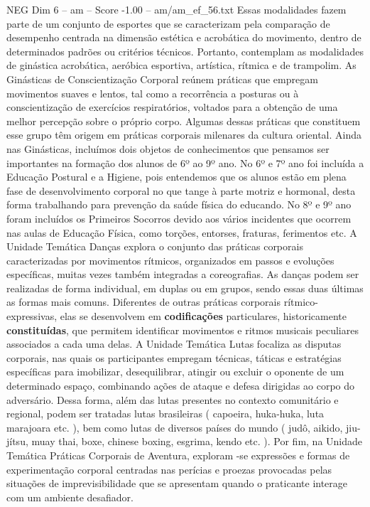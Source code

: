 \begin{textsample}{NEG Dim 6 – am – Score -1.00 – am/am\_ef\_56.txt}
Essas modalidades fazem parte de um conjunto de esportes que se caracterizam pela comparação de desempenho centrada na dimensão estética e acrobática do movimento, dentro de determinados padrões ou critérios técnicos.
Portanto, contemplam as modalidades de ginástica acrobática, aeróbica esportiva, artística, rítmica e de trampolim.
As Ginásticas de Conscientização Corporal reúnem práticas que empregam movimentos suaves e lentos, tal como a recorrência a posturas ou à conscientização de exercícios respiratórios, voltados para a obtenção de uma melhor percepção sobre o próprio corpo.
Algumas dessas práticas que constituem esse grupo têm origem em práticas corporais milenares da cultura oriental.
Ainda nas Ginásticas, incluímos dois objetos de conhecimentos que pensamos ser importantes na formação dos alunos de 6º ao 9º ano.
No 6º e 7º ano foi incluída a Educação Postural e a Higiene, pois entendemos que os alunos estão em plena fase de desenvolvimento corporal no que tange à parte motriz e hormonal, desta forma trabalhando para prevenção da saúde física do educando.
No 8º e 9º ano foram incluídos os Primeiros Socorros devido aos vários incidentes que ocorrem nas aulas de Educação Física, como torções, entorses, fraturas, ferimentos etc.
A Unidade Temática Danças explora o conjunto das práticas corporais caracterizadas por movimentos rítmicos, organizados em passos e evoluções específicas, muitas vezes também integradas a coreografias.
As danças podem ser realizadas de forma individual, em duplas ou em grupos, sendo essas duas últimas as formas mais comuns.
Diferentes de outras práticas corporais rítmico-expressivas, elas se desenvolvem em \textbf{codificações} particulares, historicamente \textbf{constituídas}, que permitem identificar movimentos e ritmos musicais peculiares associados a cada uma delas.
A Unidade Temática Lutas focaliza as disputas corporais, nas quais os participantes empregam técnicas, táticas e estratégias específicas para imobilizar, desequilibrar, atingir ou excluir o oponente de um determinado espaço, combinando ações de ataque e defesa dirigidas ao corpo do adversário.
Dessa forma, além das lutas presentes no contexto comunitário e regional, podem ser tratadas lutas brasileiras ( capoeira, huka-huka, luta marajoara etc. ), bem como lutas de diversos países do mundo ( judô, aikido, jiu-jítsu, muay thai, boxe, chinese boxing, esgrima, kendo etc. ).
Por fim, na Unidade Temática Práticas Corporais de Aventura, exploram -se expressões e formas de experimentação corporal centradas nas perícias e proezas provocadas pelas situações de imprevisibilidade que se apresentam quando o praticante interage com um ambiente desafiador.

\end{textsample}

